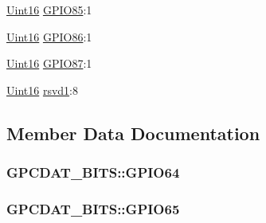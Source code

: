 \begin{DoxyCompactItemize}
\item 
\hyperlink{_d_s_p2833x___device_8h_a59a9f6be4562c327cbfb4f7e8e18f08b}{Uint16} \hyperlink{struct_g_p_c_d_a_t___b_i_t_s_a9f34071df4be7921c461298ec71a3179}{G\+P\+I\+O85}\+:1
\item 
\hyperlink{_d_s_p2833x___device_8h_a59a9f6be4562c327cbfb4f7e8e18f08b}{Uint16} \hyperlink{struct_g_p_c_d_a_t___b_i_t_s_a354f2d5a68e684cdffd7f1f6290445da}{G\+P\+I\+O86}\+:1
\item 
\hyperlink{_d_s_p2833x___device_8h_a59a9f6be4562c327cbfb4f7e8e18f08b}{Uint16} \hyperlink{struct_g_p_c_d_a_t___b_i_t_s_a69bed0f30c39fee129d30eca0447ae9f}{G\+P\+I\+O87}\+:1
\item 
\hyperlink{_d_s_p2833x___device_8h_a59a9f6be4562c327cbfb4f7e8e18f08b}{Uint16} \hyperlink{struct_g_p_c_d_a_t___b_i_t_s_a1e1ebe67050e39181798e952ab429724}{rsvd1}\+:8
\end{DoxyCompactItemize}


\subsection{Member Data Documentation}
\hypertarget{struct_g_p_c_d_a_t___b_i_t_s_ab71787e1e55c0766d59898ff9ff466bb}{}
\subsubsection[{G\+P\+I\+O64}]{ G\+P\+C\+D\+A\+T\+\_\+\+B\+I\+T\+S\+::\+G\+P\+I\+O64}\label{struct_g_p_c_d_a_t___b_i_t_s_ab71787e1e55c0766d59898ff9ff466bb}
\hypertarget{struct_g_p_c_d_a_t___b_i_t_s_a5f8f07aeba497965bfcabf00d20ab964}{}
\subsubsection[{G\+P\+I\+O65}]{ G\+P\+C\+D\+A\+T\+\_\+\+B\+I\+T\+S\+::\+G\+P\+I\+O65}\label{struct_g_p_c_d_a_t___b_i_t_s_a5f8f07aeba497965bfcabf00d20ab964}
\hypertarget{struct_g_p_c_d_a_t___b_i_t_s_abef768e55a699275c026a8cd135bf1ca}{}
